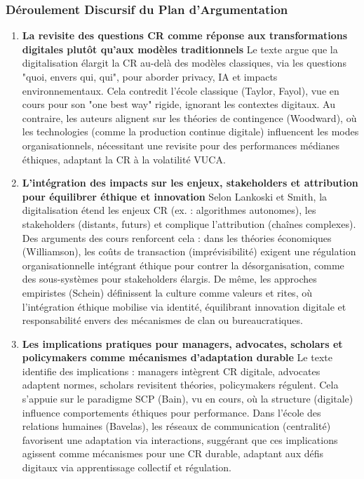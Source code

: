 \documentclass{rapportECL}
\begin{document}
\subsubsection{Déroulement Discursif du Plan d’Argumentation}
\begin{enumerate}
\item \textbf{La revisite des questions CR comme réponse aux transformations digitales plutôt qu'aux modèles traditionnels}  
Le texte argue que la digitalisation élargit la CR au-delà des modèles classiques, via les questions "quoi, envers qui, qui", pour aborder privacy, IA et impacts environnementaux. Cela contredit l'école classique (Taylor, Fayol), vue en cours pour son "one best way" rigide, ignorant les contextes digitaux. Au contraire, les auteurs alignent sur les théories de contingence (Woodward), où les technologies (comme la production continue digitale) influencent les modes organisationnels, nécessitant une revisite pour des performances médianes éthiques, adaptant la CR à la volatilité VUCA.

\item \textbf{L'intégration des impacts sur les enjeux, stakeholders et attribution pour équilibrer éthique et innovation}  
Selon Lankoski et Smith, la digitalisation étend les enjeux CR (ex. : algorithmes autonomes), les stakeholders (distants, futurs) et complique l'attribution (chaînes complexes). Des arguments des cours renforcent cela : dans les théories économiques (Williamson), les coûts de transaction (imprévisibilité) exigent une régulation organisationnelle intégrant éthique pour contrer la désorganisation, comme des sous-systèmes pour stakeholders élargis. De même, les approches empiristes (Schein) définissent la culture comme valeurs et rites, où l'intégration éthique mobilise via identité, équilibrant innovation digitale et responsabilité envers des mécanismes de clan ou bureaucratiques.

\item \textbf{Les implications pratiques pour managers, advocates, scholars et policymakers comme mécanismes d'adaptation durable}  
Le texte identifie des implications : managers intègrent CR digitale, advocates adaptent normes, scholars revisitent théories, policymakers régulent. Cela s'appuie sur le paradigme SCP (Bain), vu en cours, où la structure (digitale) influence comportements éthiques pour performance. Dans l'école des relations humaines (Bavelas), les réseaux de communication (centralité) favorisent une adaptation via interactions, suggérant que ces implications agissent comme mécanismes pour une CR durable, adaptant aux défis digitaux via apprentissage collectif et régulation.
\end{enumerate}
\end{document}
